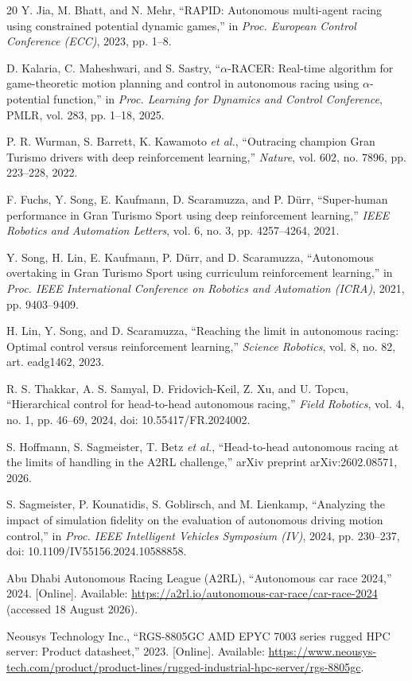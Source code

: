 \begin{thebibliography}{20}
Y. Jia, M. Bhatt, and N. Mehr,
``RAPID: Autonomous multi-agent racing using constrained potential dynamic
games,'' in \emph{Proc. European Control Conference (ECC)}, 2023, pp. 1--8.

D. Kalaria, C. Maheshwari, and S. Sastry,
``$\alpha$-RACER: Real-time algorithm for game-theoretic motion planning and
control in autonomous racing using $\alpha$-potential function,'' in
\emph{Proc. Learning for Dynamics and Control Conference}, PMLR, vol. 283,
pp. 1--18, 2025.

P. R. Wurman, S. Barrett, K. Kawamoto \emph{et al.},
``Outracing champion Gran Turismo drivers with deep reinforcement learning,''
\emph{Nature}, vol. 602, no. 7896, pp. 223--228, 2022.

F. Fuchs, Y. Song, E. Kaufmann, D. Scaramuzza, and P. D\"urr,
``Super-human performance in Gran Turismo Sport using deep reinforcement
learning,'' \emph{IEEE Robotics and Automation Letters}, vol. 6, no. 3,
pp. 4257--4264, 2021.

Y. Song, H. Lin, E. Kaufmann, P. D\"urr, and D. Scaramuzza,
``Autonomous overtaking in Gran Turismo Sport using curriculum reinforcement
learning,'' in \emph{Proc. IEEE International Conference on Robotics and
Automation (ICRA)}, 2021, pp. 9403--9409.

H. Lin, Y. Song, and D. Scaramuzza,
``Reaching the limit in autonomous racing: Optimal control versus
reinforcement learning,'' \emph{Science Robotics}, vol. 8, no. 82,
art. eadg1462, 2023.

R. S. Thakkar, A. S. Samyal, D. Fridovich-Keil, Z. Xu, and U. Topcu,
``Hierarchical control for head-to-head autonomous racing,''
\emph{Field Robotics}, vol. 4, no. 1, pp. 46--69, 2024,
doi: 10.55417/FR.2024002.

S. Hoffmann, S. Sagmeister, T. Betz \emph{et al.},
``Head-to-head autonomous racing at the limits of handling in the A2RL
challenge,'' arXiv preprint arXiv:2602.08571, 2026.

S. Sagmeister, P. Kounatidis, S. Goblirsch, and M. Lienkamp,
``Analyzing the impact of simulation fidelity on the evaluation of autonomous
driving motion control,'' in \emph{Proc. IEEE Intelligent Vehicles Symposium
(IV)}, 2024, pp. 230--237, doi: 10.1109/IV55156.2024.10588858.

Abu Dhabi Autonomous Racing League (A2RL),
``Autonomous car race 2024,'' 2024. [Online]. Available:
\url{https://a2rl.io/autonomous-car-race/car-race-2024}
(accessed 18 August 2026).

Neousys Technology Inc., ``RGS-8805GC AMD EPYC 7003 series rugged HPC server:
Product datasheet,'' 2023. [Online]. Available:
\url{https://www.neousys-tech.com/product/product-lines/rugged-industrial-hpc-server/rgs-8805gc}.

\end{thebibliography}
